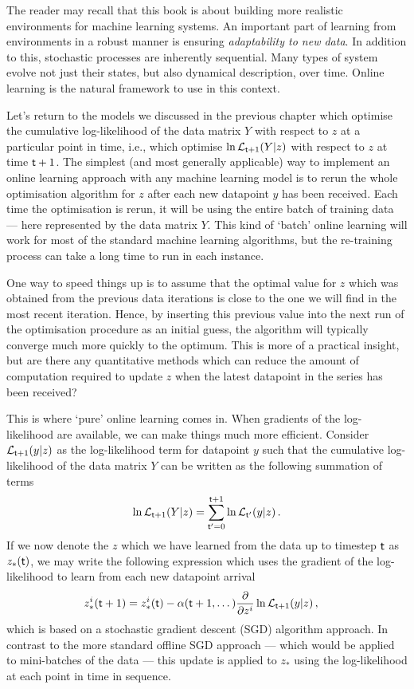 The reader may recall that this book is about building more realistic environments for machine learning systems. An important part of learning from environments in a robust manner is ensuring \emph{adaptability to new data}. In addition to this, stochastic processes are inherently sequential. Many types of system evolve not just their states, but also dynamical description, over time. Online learning is the natural framework to use in this context.

Let's return to the models we discussed in the previous chapter which optimise the cumulative log-likelihood of the data matrix $Y$ with respect to $z$ at a particular point in time, i.e., which optimise $\ln {\cal L}_{{\sf t}+1}(Y\vert z)$ with respect to $z$ at time ${\sf t}+1$. The simplest (and most generally applicable) way to implement an online learning approach with any machine learning model is to rerun the whole optimisation algorithm for $z$ after each new datapoint $y$ has been received. Each time the optimisation is rerun, it will be using the entire batch of training data --- here represented by the data matrix $Y$. This kind of `batch' online learning will work for most of the standard machine learning algorithms, but the re-training process can take a long time to run in each instance. 

One way to speed things up is to assume that the optimal value for $z$ which was obtained from the previous data iterations is close to the one we will find in the most recent iteration. Hence, by inserting this previous value into the next run of the optimisation procedure as an initial guess, the algorithm will typically converge much more quickly to the optimum. This is more of a practical insight, but are there any quantitative methods which can reduce the amount of computation required to update $z$ when the latest datapoint in the series has been received?

This is where `pure' online learning comes in. When gradients of the log-likelihood are available, we can make things much more efficient. Consider ${\cal L}_{{\sf t}+1}(y\vert z)$ as the log-likelihood term for datapoint $y$ such that the cumulative log-likelihood of the data matrix $Y$ can be written as the following summation of terms
\begin{align}
\ln {\cal L}_{{\sf t}+1}(Y\vert z) = \sum^{{\sf t}+1}_{{\sf t}'=0}\ln {\cal L}_{{\sf t}'}(y\vert z)\,.
\end{align}
If we now denote the $z$ which we have learned from the data up to timestep ${\sf t}$ as $z_*({\sf t})$, we may write the following expression which uses the gradient of the log-likelihood to learn from each new datapoint arrival
\begin{align}
z^i_*({\sf t}+1) &= z^i_*({\sf t}) - \alpha ({\sf t}+1,\dots ) \frac{\partial}{\partial z^i} \ln {\cal L}_{{\sf t}+1}(y\vert z) \label{eq:sgd-online} \,,
\end{align}
which is based on a stochastic gradient descent (SGD) algorithm approach. In contrast to the more standard offline SGD approach --- which would be applied to mini-batches of the data --- this update is applied to $z_*$ using the log-likelihood at each point in time in sequence.

